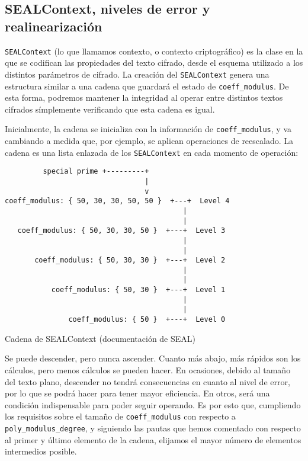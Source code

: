 \subsection{SEALContext, niveles de error y realinearización}

\verb|SEALContext| (lo que llamamos contexto, o contexto criptográfico) es la clase en la que se codifican las propiedades del texto cifrado, desde el esquema utilizado a los distintos parámetros de cifrado. La creación del \verb|SEALContext| genera una estructura similar a una cadena que guardará el estado de \verb|coeff_modulus|. De esta forma, podremos mantener la integridad al operar entre distintos textos cifrados símplemente verificando que esta cadena es igual.

Inicialmente, la cadena se inicializa con la información de \verb|coeff_modulus|, y va cambiando a medida que, por ejemplo, se aplican operaciones de reescalado. La cadena es una lista enlazada de los \verb|SEALContext| en cada momento de operación:

\begin{listing}[ht]
    \begin{verbatim}
         special prime +---------+
                                 |
                                 v
coeff_modulus: { 50, 30, 30, 50, 50 }  +---+  Level 4
                                          |
                                          |
   coeff_modulus: { 50, 30, 30, 50 }  +---+  Level 3
                                          |
                                          |
       coeff_modulus: { 50, 30, 30 }  +---+  Level 2
                                          |
                                          |
           coeff_modulus: { 50, 30 }  +---+  Level 1
                                          |
                                          |
               coeff_modulus: { 50 }  +---+  Level 0
    \end{verbatim}
    \caption{Cadena de SEALContext (documentación de SEAL)}\label{fig:seal_levels}
\end{listing}

Se puede descender, pero nunca ascender. Cuanto más abajo, más rápidos son los cálculos, pero menos cálculos se pueden hacer. En ocasiones, debido al tamaño del texto plano, descender no tendrá consecuencias en cuanto al nivel de error, por lo que se podrá hacer para tener mayor eficiencia. En otros, será una condición indispensable para poder seguir operando. Es por esto que, cumpliendo los requisitos sobre el tamaño de \verb|coeff_modulus| con respecto a \verb|poly_modulus_degree|, y siguiendo las pautas que hemos comentado con respecto al primer y último elemento de la cadena, elijamos el mayor número de elementos intermedios posible.

